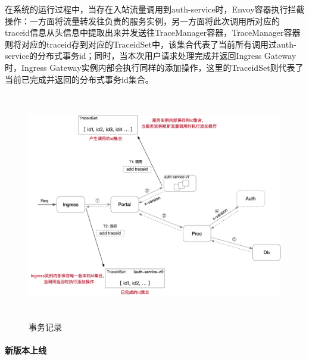 \documentclass[a4paper]{article}
\theoremstyle{definition}
\begin{document}
在系统的运行过程中，当存在入站流量调用到auth-service时，Envoy容器执行拦截操作：一方面将流量转发往负责的服务实例，另一方面将此次调用所对应的traceid信息从头信息中提取出来并发送往TraceManager容器，TraceManager容器则将对应的traceid存到对应的TraceidSet中，该集合代表了当前所有调用过auth-service的分布式事务id；同时，当本次用户请求处理完成并返回Ingress Gateway时，Ingress Gateway实例内部会执行同样的添加操作，这里的TraceidSet则代表了当前已完成并返回的分布式事务id集合。
\begin{figure}[ht]
 \centering
 \includegraphics[height=10cm]{images/record_trace.png}
 \caption{事务记录}
 \label{fig:record_trace}
\end{figure}

\paragraph{新版本上线}\mbox{}\\
\end{document}
